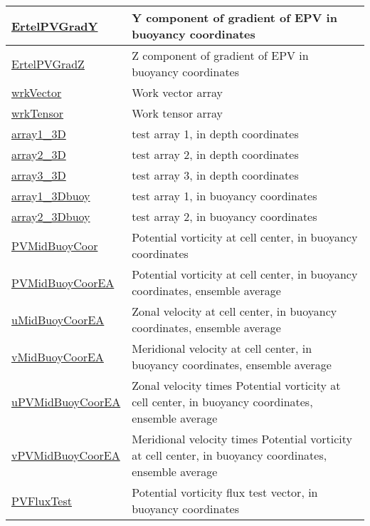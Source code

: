 {\begin{center}
\begin{longtable}{| p{2.0in} | p{4.0in} |}
    \hline
    \hyperref[subsec:var_sec_eliassenPalmAMPKGScratch_ErtelPVGradY]{ErtelPVGradY} & Y component of gradient of EPV in buoyancy coordinates \\
    \hline
    \hyperref[subsec:var_sec_eliassenPalmAMPKGScratch_ErtelPVGradZ]{ErtelPVGradZ} & Z component of gradient of EPV in buoyancy coordinates \\
    \hline
    \hyperref[subsec:var_sec_eliassenPalmAMPKGScratch_wrkVector]{wrkVector} & Work vector array \\
    \hline
    \hyperref[subsec:var_sec_eliassenPalmAMPKGScratch_wrkTensor]{wrkTensor} & Work tensor array \\
    \hline
    \hyperref[subsec:var_sec_eliassenPalmAMPKGScratch_array1_3D]{array1\_3D} & test array 1, in depth coordinates \\
    \hline
    \hyperref[subsec:var_sec_eliassenPalmAMPKGScratch_array2_3D]{array2\_3D} & test array 2, in depth coordinates \\
    \hline
    \hyperref[subsec:var_sec_eliassenPalmAMPKGScratch_array3_3D]{array3\_3D} & test array 3, in depth coordinates \\
    \hline
    \hyperref[subsec:var_sec_eliassenPalmAMPKGScratch_array1_3Dbuoy]{array1\_3Dbuoy} & test array 1, in buoyancy coordinates \\
    \hline
    \hyperref[subsec:var_sec_eliassenPalmAMPKGScratch_array2_3Dbuoy]{array2\_3Dbuoy} & test array 2, in buoyancy coordinates \\
    \hline
    \hyperref[subsec:var_sec_eliassenPalmAMPKGScratch_PVMidBuoyCoor]{PVMidBuoyCoor} & Potential vorticity at cell center, in buoyancy coordinates \\
    \hline
    \hyperref[subsec:var_sec_eliassenPalmAMPKGScratch_PVMidBuoyCoorEA]{PVMidBuoyCoorEA} & Potential vorticity at cell center, in buoyancy coordinates, ensemble average \\
    \hline
    \hyperref[subsec:var_sec_eliassenPalmAMPKGScratch_uMidBuoyCoorEA]{uMidBuoyCoorEA} & Zonal velocity at cell center, in buoyancy coordinates, ensemble average \\
    \hline
    \hyperref[subsec:var_sec_eliassenPalmAMPKGScratch_vMidBuoyCoorEA]{vMidBuoyCoorEA} & Meridional velocity at cell center, in buoyancy coordinates, ensemble average \\
    \hline
    \hyperref[subsec:var_sec_eliassenPalmAMPKGScratch_uPVMidBuoyCoorEA]{uPVMidBuoyCoorEA} & Zonal velocity times Potential vorticity at cell center, in buoyancy coordinates, ensemble average \\
    \hline
    \hyperref[subsec:var_sec_eliassenPalmAMPKGScratch_vPVMidBuoyCoorEA]{vPVMidBuoyCoorEA} & Meridional velocity times Potential vorticity at cell center, in buoyancy coordinates, ensemble average \\
    \hline
    \hyperref[subsec:var_sec_eliassenPalmAMPKGScratch_PVFluxTest]{PVFluxTest} & Potential vorticity flux test vector, in buoyancy coordinates \\
    \hline
\end{longtable}
\end{center}
}
